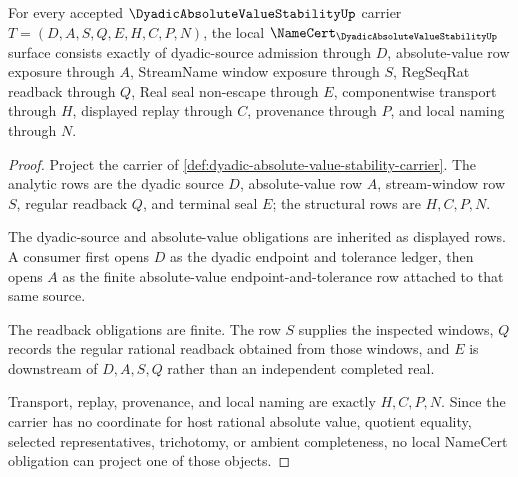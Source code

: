 \begin{theorem}
\label{thm:dyadic-absolute-value-stability-namecert-obligations}
For every accepted $\DyadicAbsoluteValueStabilityUp$ carrier $T=(D,A,S,Q,E,H,C,P,N)$, the local $\NameCert_{\DyadicAbsoluteValueStabilityUp}$ surface consists exactly of dyadic-source admission through $D$, absolute-value row exposure through $A$, StreamName window exposure through $S$, RegSeqRat readback through $Q$, Real seal non-escape through $E$, componentwise transport through $H$, displayed replay through $C$, provenance through $P$, and local naming through $N$.
\end{theorem}
\begin{proof}
Project the carrier of \autoref{def:dyadic-absolute-value-stability-carrier}. The analytic rows are the dyadic source $D$, absolute-value row $A$, stream-window row $S$, regular readback $Q$, and terminal seal $E$; the structural rows are $H,C,P,N$.

The dyadic-source and absolute-value obligations are inherited as displayed rows. A consumer first opens $D$ as the dyadic endpoint and tolerance ledger, then opens $A$ as the finite absolute-value endpoint-and-tolerance row attached to that same source.

The readback obligations are finite. The row $S$ supplies the inspected windows, $Q$ records the regular rational readback obtained from those windows, and $E$ is downstream of $D,A,S,Q$ rather than an independent completed real.

Transport, replay, provenance, and local naming are exactly $H,C,P,N$. Since the carrier has no coordinate for host rational absolute value, quotient equality, selected representatives, trichotomy, or ambient completeness, no local NameCert obligation can project one of those objects.
\end{proof}

